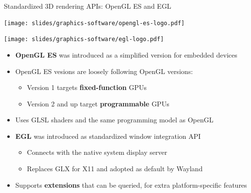 \begin{frame}[t]{Standardized 3D rendering APIs: OpenGL ES and EGL}
  \begin{minipage}[t]{0.49\textwidth}
    \centering
    \texttt{[image: slides/graphics-software/opengl-es-logo.pdf]}
  \end{minipage}
  \hfill
  \begin{minipage}[t]{0.49\textwidth}
    \centering
    \texttt{[image: slides/graphics-software/egl-logo.pdf]}
  \end{minipage}
  \vspace{0.5em}
  \begin{itemize}
  \item \textbf{OpenGL ES} was introduced as a simplified version for embedded devices
  \item OpenGL ES vesions are loosely following OpenGL versions:
    \begin{itemize}
    \item Version 1 targets \textbf{fixed-function} GPUs
    \item Version 2 and up target \textbf{programmable} GPUs
    \end{itemize}
  \item Uses GLSL shaders and the same programming model as OpenGL
  \item \textbf{EGL} was introduced as standardized window integration API
    \begin{itemize}
    \item Connects with the native system display server
    \item Replaces GLX for X11 and adopted as default by Wayland
    \end{itemize}
  \item Supports \textbf{extensions} that can be queried, for extra platform-specific features
  \end{itemize}
\end{frame}

